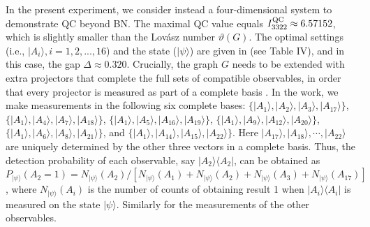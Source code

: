 \documentclass[prl,letterpaper,english,reprint,nofootinbib,aps,superscriptaddress,showpacs,showkeys]{revtex4-1}
\theoremstyle{definition}
\theoremstyle{remark}
\begin{document}
In the present experiment, we consider instead a four-dimensional system to demonstrate QC beyond BN. The maximal QC value equals $I_{3322}^{\rm QC}\approx6.57152$, which is slightly smaller than the Lov\'asz number $\vartheta(G)$. The optimal settings (i.e., $|A_i\rangle, i=1,2,...,16$) and the state ($|\psi\rangle$) are given in \cite{SM} (see Table IV), and in this case, the gap $\Delta\approx 0.320$.
Crucially, the graph $G$ needs to be extended with extra projectors that complete the full sets of compatible observables, in order that every projector is measured as part of a complete basis \cite{yxiao17}. In the work, we make measurements in the following six complete bases: $\{|A_1\rangle,|A_2\rangle,|A_3\rangle,|A_{17}\rangle\}$,
$\{|A_1\rangle,|A_4\rangle,|A_7\rangle,|A_{18}\rangle\}$, $\{|A_1\rangle,|A_{5}\rangle,|A_{16}\rangle,|A_{19}\rangle\}$,
$\{|A_1\rangle,|A_{9}\rangle,|A_{12}\rangle,|A_{20}\rangle\}$, $\{|A_1\rangle,|A_{6}\rangle,|A_{8}\rangle,|A_{21}\rangle\}$, and $\{|A_1\rangle,|A_{14}\rangle,|A_{15}\rangle,|A_{22}\rangle\}$.
 Here   $|A_{17}\rangle,|A_{18}\rangle,\cdots,|A_{22}\rangle$ are uniquely determined by the other three vectors in a complete basis.
 Thus, the detection probability of each observable, say $|A_{2}\rangle\langle A_{2}|$, can be obtained as $P_{|\psi\rangle}(A_2=1)=
{N_{|\psi\rangle}(A_2)}/[N_{|\psi\rangle}(A_1)+N_{|\psi\rangle}(A_2)+N_{|\psi\rangle}(A_3)+N_{|\psi\rangle}(A_{17})]$,
where $N_{|\psi\rangle}(A_i)$ is the number of counts of obtaining result 1 when $|A_{i}\rangle\langle A_{i}|$ is measured on the state $|\psi\rangle.$ Similarly for the measurements of the other observables.
\end{document}
